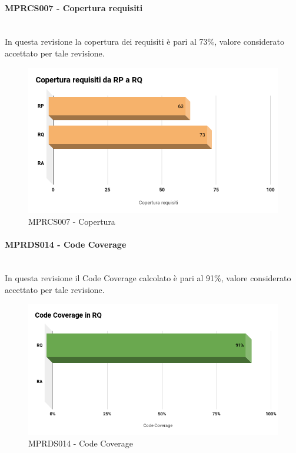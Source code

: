 \paragraph{MPRCS007 - Copertura requisiti}\mbox{}\\[0.4cm]
In questa revisione la copertura dei requisiti è pari al 73\%, valore considerato accettato per tale revisione.
\begin{figure}[H]
	\centering
	\includegraphics[width=13cm,keepaspectratio]{../includes/pics/CoperturaRP_RQ.png}
	\caption{\label{fig:mission}MPRCS007 - Copertura}
\end{figure}
\paragraph{MPRDS014 - Code Coverage}\mbox{}\\[0.4cm]
\label{sec:CCRQ}
In questa revisione il Code Coverage calcolato è pari al 91\%, valore considerato accettato per tale revisione.
\begin{figure}[H]
	\centering
	\includegraphics[width=13cm,keepaspectratio]{../includes/pics/ccRQ.png}
	\caption{\label{fig:mission}MPRDS014 - Code Coverage}
\end{figure}


